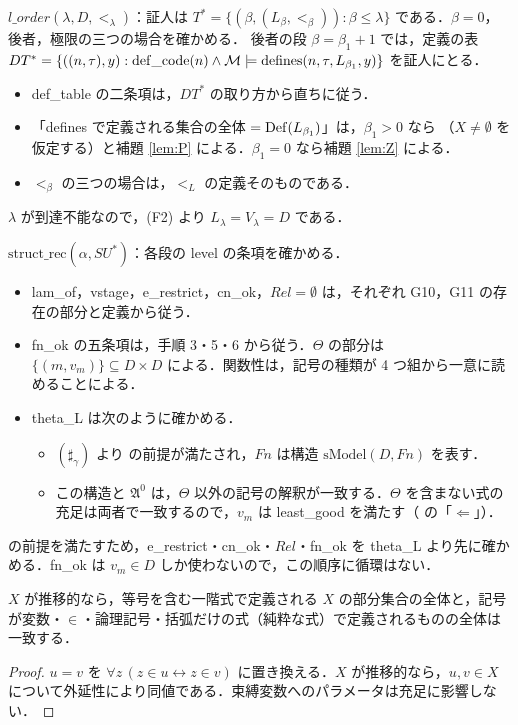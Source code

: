 \emph{$l\_order(\lambda,D,<_\lambda)$}：証人は $T^*=\{(\beta,(L_\beta,<_\beta)):\beta\le\lambda\}$ である．$\beta=0$，後者，極限の三つの場合を確かめる．
後者の段 $\beta=\beta_1+1$ では，定義の表 $DT^*=\{((n,\tau),y):\mathrm{def\_code}(n)\wedge\mathcal{M}\models\mathrm{defines}(n,\tau,L_{\beta_1},y)\}$ を証人にとる．
\begin{itemize}
\item def\_table の二条項は，$DT^*$ の取り方から直ちに従う．
\item 「defines で定義される集合の全体 $=\mathrm{Def}(L_{\beta_1})$」は，$\beta_1>0$ なら （$X\neq\emptyset$ を仮定する）と補題 \ref{lem:P} による．$\beta_1=0$ なら補題 \ref{lem:Z} による．
\item $<_{\beta}$ の三つの場合は，$<_L$ の定義そのものである．
\end{itemize}
$\lambda$ が到達不能なので，(F2) より $L_\lambda=V_\lambda=D$ である．

\emph{$\mathrm{struct\_rec}(\alpha,SU^*)$}：各段の level の条項を確かめる．
\begin{itemize}
\item lam\_of，vstage，e\_restrict，cn\_ok，$Rel=\emptyset$ は，それぞれ G10，G11 の存在の部分と定義から従う．
\item fn\_ok の五条項は，手順 3・5・6 から従う．$\Theta$ の部分は $\{(m,v_m)\}\subseteq D\times D$ による．関数性は，記号の種類が 4 つ組から一意に読めることによる．
\item theta\_L は次のように確かめる．
  \begin{itemize}
  \item $(\sharp_\gamma)$ より  の前提が満たされ，$Fn$ は構造 $\mathrm{sModel}(D,Fn)$ を表す．
  \item この構造と $\mathfrak A^0$ は，$\Theta$ 以外の記号の解釈が一致する．$\Theta$ を含まない式の充足は両者で一致するので，$v_m$ は least\_good を満たす（ の「$\Leftarrow$」）．
  \end{itemize}
\end{itemize}
 の前提を満たすため，e\_restrict・cn\_ok・$Rel$・fn\_ok を theta\_L より先に確かめる．fn\_ok は $v_m\in D$ しか使わないので，この順序に循環はない．

\begin{lemma}\label{lem:P}
$X$ が推移的なら，等号を含む一階式で定義される $X$ の部分集合の全体と，記号が変数・$\in$・論理記号・括弧だけの式（純粋な式）で定義されるものの全体は一致する．
\end{lemma}
\begin{proof}
$u=v$ を $\forall z\,(z\in u\leftrightarrow z\in v)$ に置き換える．$X$ が推移的なら，$u,v\in X$ について外延性により同値である．束縛変数へのパラメータは充足に影響しない．
\end{proof}

